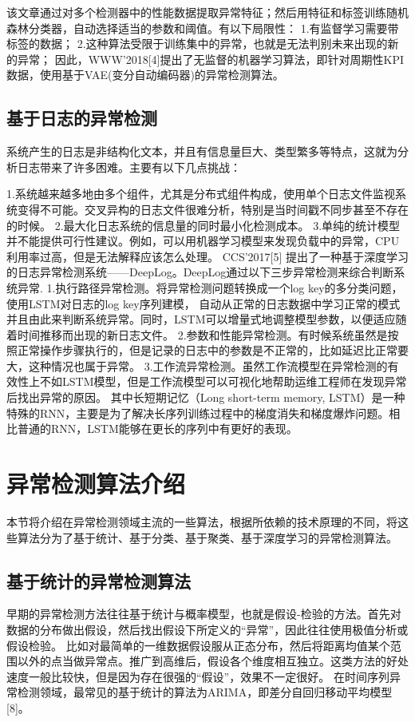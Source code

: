 该文章通过对多个检测器中的性能数据提取异常特征；然后用特征和标签训练随机森林分类器，自动选择适当的参数和阈值。有以下局限性：
1.有监督学习需要带标签的数据；
2.这种算法受限于训练集中的异常，也就是无法判别未来出现的新的异常；
因此，WWW’2018[4]提出了无监督的机器学习算法，即针对周期性KPI数据，使用基于VAE(变分自动编码器)的异常检测算法。

\subsection{基于日志的异常检测}
系统产生的日志是非结构化文本，并且有信息量巨大、类型繁多等特点，这就为分析日志带来了许多困难。主要有以下几点挑战： 

1.系统越来越多地由多个组件，尤其是分布式组件构成，使用单个日志文件监视系统变得不可能。交叉异构的日志文件很难分析，特别是当时间戳不同步甚至不存在的时候。
2.最大化日志系统的信息量的同时最小化检测成本。
3.单纯的统计模型并不能提供可行性建议。例如，可以用机器学习模型来发现负载中的异常，CPU利用率过高，但是无法解释应该怎么处理。
CCS’2017[5] 提出了一种基于深度学习的日志异常检测系统——DeepLog。DeepLog通过以下三步异常检测来综合判断系统异常.
1.执行路径异常检测。将异常检测问题转换成一个log key的多分类问题，使用LSTM对日志的log key序列建模， 自动从正常的日志数据中学习正常的模式并且由此来判断系统异常。同时，LSTM可以增量式地调整模型参数，以便适应随着时间推移而出现的新日志文件。
2.参数和性能异常检测。有时候系统虽然是按照正常操作步骤执行的，但是记录的日志中的参数是不正常的，比如延迟比正常要大，这种情况也属于异常。
3.工作流异常检测。虽然工作流模型在异常检测的有效性上不如LSTM模型，但是工作流模型可以可视化地帮助运维工程师在发现异常后找出异常的原因。
其中长短期记忆（Long short-term memory, LSTM）是一种特殊的RNN，主要是为了解决长序列训练过程中的梯度消失和梯度爆炸问题。相比普通的RNN，LSTM能够在更长的序列中有更好的表现。

\section{异常检测算法介绍}

本节将介绍在异常检测领域主流的一些算法，根据所依赖的技术原理的不同，将这些算法分为了基于统计、基于分类、基于聚类、基于深度学习的异常检测算法。
\subsection{基于统计的异常检测算法}
早期的异常检测方法往往基于统计与概率模型，也就是假设-检验的方法。首先对数据的分布做出假设，然后找出假设下所定义的“异常”，因此往往使用极值分析或假设检验。
比如对最简单的一维数据假设服从正态分布，然后将距离均值某个范围以外的点当做异常点。推广到高维后，假设各个维度相互独立。这类方法的好处速度一般比较快，但是因为存在很强的“假设”，效果不一定很好。
在时间序列异常检测领域，最常见的基于统计的算法为ARIMA，即差分自回归移动平均模型[8]。

